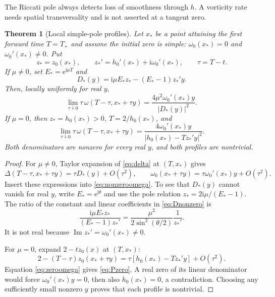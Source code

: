 \documentclass[10pt]{article}
\newcommand{\e}{\mathrm e}
\newcommand{\ii}{\mathrm i}
\newtheorem{theorem}{Theorem}
\begin{document}
The Riccati pole always detects loss of smoothness through $h$.  A
vorticity rate needs spatial transversality and is not asserted at a
tangent zero.

\begin{theorem}[Local simple-pole profiles]\label{thm:profile}
Let $x_*$ be a point attaining the first forward time $T=T_+$ and assume
the initial zero is simple: $\omega_0(x_*)=0$ and
$\omega_0'(x_*)\ne0$.  Put
\[
 z_*=z_0(x_*),\qquad z_*'=h_0'(x_*)+\ii\omega_0'(x_*),
 \qquad \tau=T-t.
\]
If $\mu\ne0$, set $E_*=\e^{\ii\mu T}$ and
\begin{equation}
 D_*(y)=\ii\mu E_*z_*-(E_*-1)z_*'y.              \label{eq:Dnonzero}
\end{equation}
Then, locally uniformly for real $y$,
\begin{equation}
 \lim_{\tau\downarrow0}\tau\,
 \omega(T-\tau,x_*+\tau y)
 =\frac{4\mu^2\omega_0'(x_*)y}{|D_*(y)|^2}.      \label{eq:Pnonzero}
\end{equation}
If $\mu=0$, then $z_*=h_0(x_*)>0$, $T=2/h_0(x_*)$, and
\begin{equation}
 \lim_{\tau\downarrow0}\tau\,
 \omega(T-\tau,x_*+\tau y)
 =\frac{4\omega_0'(x_*)y}
 {|h_0(x_*)-Tz_*'y|^2}.                          \label{eq:Pzero}
\end{equation}
Both denominators are nonzero for every real $y$, and both profiles are
nontrivial.
\end{theorem}

\begin{proof}
For $\mu\ne0$, Taylor expansion of \eqref{eq:delta} at $(T,x_*)$ gives
\[
 \Delta(T-\tau,x_*+\tau y)=\tau D_*(y)+O(\tau^2),
 \qquad
 \omega_0(x_*+\tau y)=\tau\omega_0'(x_*)y+O(\tau^2).
\]
Insert these expressions into \eqref{eq:nonzeroomega}.  To see that
$D_*(y)$ cannot vanish for real $y$, write
$E_*=\e^{\ii\theta}$ and use the pole relation
$z_*=2\ii\mu/(E_*-1)$.  The ratio of the constant and linear coefficients
in \eqref{eq:Dnonzero} is
\[
 \frac{\ii\mu E_*z_*}{(E_*-1)z_*'}
 =\frac{\mu^2}{2\sin^2(\theta/2)}\frac1{z_*'}.
\]
It is not real because $\operatorname{Im}z_*'=\omega_0'(x_*)\ne0$.

For $\mu=0$, expand $2-tz_0(x)$ at $(T,x_*)$:
\[
 2-(T-\tau)z_0(x_*+\tau y)
 =\tau[h_0(x_*)-Tz_*'y]+O(\tau^2).
\]
Equation \eqref{eq:zeroomega} gives \eqref{eq:Pzero}.  A real zero of its
linear denominator would force $\omega_0'(x_*)y=0$, then also
$h_0(x_*)=0$, a contradiction.  Choosing any sufficiently small nonzero
$y$ proves that each profile is nontrivial.
\end{proof}
\end{document}
